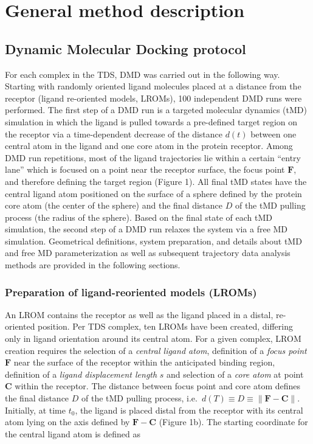 \section{General method description}
\subsection{Dynamic Molecular Docking protocol}
For each complex in the TDS, DMD was carried out in the following way.
Starting with randomly oriented ligand molecules placed at a distance from the receptor
(ligand re-oriented models, LROMs), 100 independent DMD runs were performed.
The first step of a DMD run is a targeted molecular dynamics (tMD) simulation in which
the ligand is pulled towards a pre-defined target region on the receptor via a time-dependent decrease of the
distance $d(t)$ between one central atom in the ligand and one core atom in the
protein receptor. Among DMD run repetitions, most of the ligand trajectories
lie within a certain \enquote{entry lane} which is focused on a
point near the receptor surface, the focus point $\bm{F}$, and therefore
defining the target region (Figure 1).
All final tMD states have the central ligand atom positioned on the surface of a sphere defined by
the protein core atom (the center of the sphere) and the final distance $D$ of the
tMD pulling process (the radius of the sphere).
Based on the final state of each
tMD simulation, the second step of a DMD run relaxes the system via a free MD
 simulation. Geometrical definitions, system preparation, and details about tMD
and free MD parameterization as well as subsequent trajectory data analysis
methods are provided in the following sections.


\subsubsection{Preparation of ligand-reoriented models (LROMs)}
An LROM contains the receptor as well as the ligand placed in a distal, re-oriented position.
Per TDS complex, ten LROMs have been created,
differing only in ligand orientation around its central atom. For a given complex, LROM creation requires the
selection of a \textit{central ligand atom}, definition of a \textit{focus point} $\bm{F}$ near the
surface of the receptor within the anticipated binding region, definition of a
\textit{ligand displacement length} $s$ and selection of a \textit{core atom} at point $\bm{C}$ within the
receptor. The distance between focus point and core atom defines the final
distance $D$ of the tMD pulling process, i.e.\  $d(T) \equiv D \equiv  \lVert \bm{F}-\bm{C} \rVert$.
Initially, at time $t_0$, the ligand is placed distal from the receptor with its central atom lying
on the axis defined by $\bm{F}-\bm{C}$ (Figure 1b). The starting coordinate for the central
ligand atom is defined as

